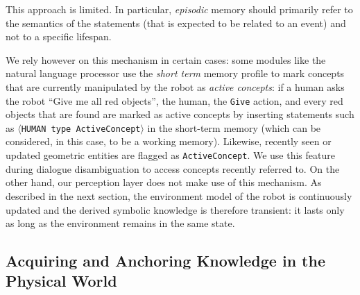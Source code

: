 \documentclass[preprint,3p,times]{elsarticle}
\newcommand{\concept}[1]{{\small \texttt{#1}}}
\newcommand{\stmt}[1]{{\footnotesize\tt$\langle$#1\relax$\rangle$}}
\begin{document}
This approach is limited. In particular, \emph{episodic} memory should primarily
refer to the semantics of the statements (that is expected to be related to an
event) and not to a specific lifespan.

We rely however on this mechanism in certain cases: some modules
like the natural language processor use the {\it short term} memory profile to
mark concepts that are currently manipulated by the
robot as \emph{active concepts}: if a human asks the robot ``Give
me all red objects'', the human, the \concept{Give} action, and every red
objects that are found are marked as active concepts by
inserting statements such as \stmt{HUMAN type ActiveConcept} in the short-term
memory (which can be considered, in this case, to be a working memory).
Likewise, recently seen or updated geometric entities are flagged as
\concept{ActiveConcept}. We use this feature during dialogue disambiguation to
access concepts recently referred to. On the other hand, our perception layer does not make use of this
mechanism. As described in the next section, the environment model of the robot
is continuously updated and the derived symbolic knowledge is therefore
transient: it lasts only as long as the environment remains in the same state.


\subsection{Acquiring and Anchoring Knowledge in the Physical World}
\label{sect|sit-ass}
\end{document}
